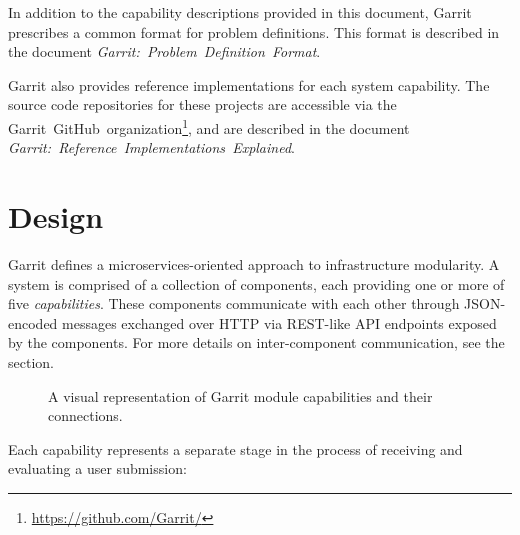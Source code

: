 \documentclass[11pt,letterpaper]{article}
\begin{document}
In addition to the capability descriptions provided in this document, Garrit
prescribes a common format for problem definitions. This format is described in
the document \emph{Garrit:~Problem~Definition~Format}.

Garrit also provides reference implementations for each system capability.
The source code repositories for these projects are accessible via the
Garrit~GitHub~organization\footnote{\url{https://github.com/Garrit/}}, and are
described in the document \emph{Garrit:~Reference~Implementations~Explained}.

\section{Design}
\label{design}

Garrit defines a microservices-oriented approach to infrastructure modularity.
A system is comprised of a collection of components, each providing one or more
of five \emph{capabilities}. These components communicate with each other
through JSON-encoded messages exchanged over HTTP via REST-like API endpoints
exposed by the components. For more details on inter-component communication,
see the  section.

\begin{figure}[h]
\centering
{}
\caption{A visual representation of Garrit module capabilities and their
connections.}
\end{figure}

Each capability represents a separate stage in the process of receiving and
evaluating a user submission:
\end{document}

